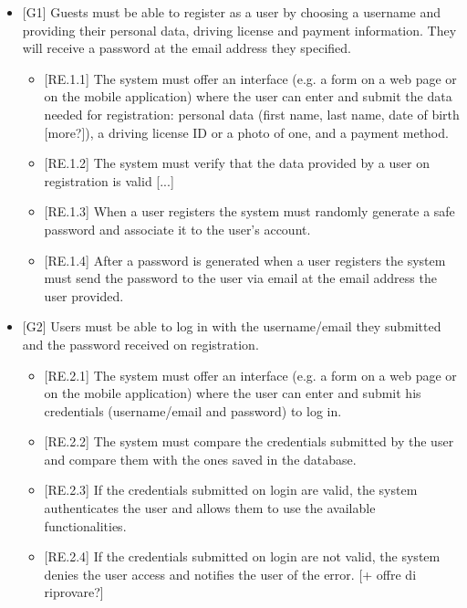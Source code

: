 \documentclass[english]{article}
\begin{document}
\begin{itemize}

\item{[G1] Guests must be able to register as a user by choosing a username and providing their personal data, driving license and payment information. They will receive a password at the email address they specified.
	
\begin{itemize}
\item{[RE.1.1] The system must offer an interface (e.g. a form on a web page or on the mobile application) where the user can enter and submit the data needed for registration: personal data (first name, last name, date of birth [more?]), a driving license ID or a photo of one, and a payment method.}
\item{[RE.1.2] The system must verify that the data provided by a user on registration is valid [...]}
\item{[RE.1.3] When a user registers the system must randomly generate a safe password and associate it to the user’s account.}
\item{[RE.1.4] After a password is generated when a user registers the system must send the password to the user via email at the email address the user provided.}
\end{itemize}
}

\item{[G2] Users must be able to log in with the username/email they submitted and the password received on registration.
\begin{itemize}
	\item{[RE.2.1] The system must offer an interface (e.g. a form on a web page or on the mobile application) where the user can enter and submit his credentials (username/email and password) to log in.}
	\item{[RE.2.2] The system must compare the credentials submitted by the user and compare them with the ones saved in the database.}
	\item{[RE.2.3] If the credentials submitted on login are valid, the system authenticates the user and allows them to use the available functionalities.}
	\item{[RE.2.4] If the credentials submitted on login are not valid, the system denies the user access and notifies the user of the error.}
[+ offre di riprovare?]
\end{itemize}
}


\end{itemize}
\end{document}

